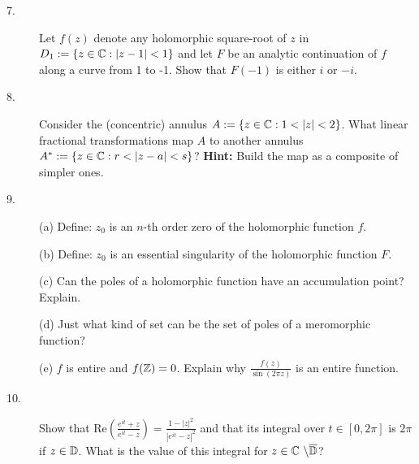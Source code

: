 \documentclass{article}
\begin{document}
\begin{description}
\item[7.]
Let $f(z)$ denote any holomorphic square-root of $z$ in
$D_1 := \{z \in \Bbb C : |z-1| < 1 \}$ and let $F$ be an analytic continuation
of $f$ along a curve from 1 to -1. Show that $F(-1)$ is either $i$ or $-i$.

\item[8.]
Consider the (concentric) annulus $A := \{z \in \Bbb C : 1 < |z| < 2\}$.
What linear fractional transformations map $A$ to another annulus
$A^\ast := \{z \in \Bbb C : r < |z-a| < s\}$? {\bf Hint:} Build the map
as a composite of simpler ones.

\item[9.] (a)
Define: $z_0$ is an $n$-th order zero of the holomorphic function $f$.

\item[\quad] (b)
Define: $z_0$ is an essential singularity of the holomorphic function $F$.

\item[\quad] (c)
Can the poles of a holomorphic function have an accumulation point? Explain.

\item[\quad] (d)
Just what kind of set can be the set of poles of a meromorphic function?

\item[\quad] (e)
$f$ is entire and $f(\Bbb Z) = 0$. Explain why
$\frac{f(z)}{\sin (2\pi z)}$ is an entire function.

\item[10.]
Show that
Re$\left(\frac{e^{it} + z}{e^{it}-z} \right) = \frac{1-|z|^2}{|e^{it}-z|^2}$
and that its integral over $t \in [0,2\pi]$ is $2\pi$ if $z \in \Bbb D$.
What is the value of this integral for
$z \in \Bbb C\ \backslash \overline{\Bbb D}$?





\end{description}    
\end{document}
